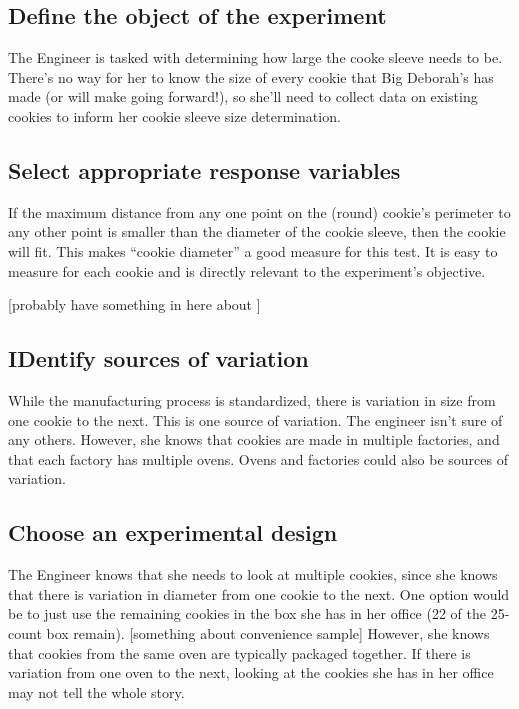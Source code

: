 \documentclass[]{book}
\begin{document}
\hypertarget{define-the-object-of-the-experiment}{%
\subsection{Define the object of the experiment}\label{define-the-object-of-the-experiment}}

The Engineer is tasked with determining how large the cooke sleeve needs to be. There's no way for her to know the size of every cookie that Big Deborah's has made (or will make going forward!), so she'll need to collect data on existing cookies to inform her cookie sleeve size determination.

\hypertarget{select-appropriate-response-variables}{%
\subsection{Select appropriate response variables}\label{select-appropriate-response-variables}}

If the maximum distance from any one point on the (round) cookie's perimeter to any other point is smaller than the diameter of the cookie sleeve, then the cookie will fit. This makes ``cookie diameter'' a good measure for this test. It is easy to measure for each cookie and is directly relevant to the experiment's objective.

{[}probably have something in here about {]}

\hypertarget{identify-sources-of-variation}{%
\subsection{IDentify sources of variation}\label{identify-sources-of-variation}}

While the manufacturing process is standardized, there is variation in size from one cookie to the next. This is one source of variation. The engineer isn't sure of any others. However, she knows that cookies are made in multiple factories, and that each factory has multiple ovens. Ovens and factories could also be sources of variation.

\hypertarget{choose-an-experimental-design-2}{%
\subsection{Choose an experimental design}\label{choose-an-experimental-design-2}}

The Engineer knows that she needs to look at multiple cookies, since she knows that there is variation in diameter from one cookie to the next. One option would be to just use the remaining cookies in the box she has in her office (22 of the 25-count box remain). {[}something about convenience sample{]} However, she knows that cookies from the same oven are typically packaged together. If there is variation from one oven to the next, looking at the cookies she has in her office may not tell the whole story.
\end{document}
